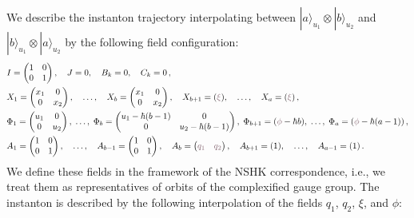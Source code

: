 \documentclass[10pt]{article}
\theoremstyle{definition}
\numberwithin{equation}{section}
\begin{document}
We describe the instanton trajectory interpolating between $|a\rangle_{u_1}\otimes |b\rangle_{u_2}$ and $|b\rangle_{u_1}\otimes |a\rangle_{u_2}$ by the following field configuration:
\begin{equation}
	\begin{aligned}
		& I=\begin{pmatrix}
			1 & 0\\
			0 & 1
		\end{pmatrix},\quad J=0,\quad B_k=0,\quad C_k=0\,,\\
		& X_1=\begin{pmatrix}
			x_1 & 0\\
			0 & x_2
		\end{pmatrix},\quad\ldots,\quad X_b=\begin{pmatrix}
		x_1 & 0\\
		0 & x_2
		\end{pmatrix}, \quad X_{b+1}=({\color{color2}\xi}),\quad\ldots,\quad X_{a}=({\color{color2}\xi})\,,\\
		& \Phi_1=\begin{pmatrix}
			u_1 & 0\\
			0 & u_2
		\end{pmatrix},\; \ldots,\; \Phi_b=\begin{pmatrix}
			u_1-\hbar(b-1) & 0\\
			0 & u_2-\hbar(b-1)
		\end{pmatrix}, \; \Phi_{b+1}=({\color{color2}\phi}-\hbar b),\; \ldots,\; \Phi_{a}=({\color{color2}\phi}-\hbar(a-1))\,,\\
		& A_1=\begin{pmatrix}
			1 & 0\\
			0 & 1\\
		\end{pmatrix},\quad\ldots,\quad A_{b-1}=\begin{pmatrix}
		1 & 0\\
		0 & 1\\
		\end{pmatrix},\quad A_b=\begin{pmatrix}
		{\color{color2}q_1} & {\color{color2}q_2}
		\end{pmatrix},\quad A_{b+1}=(1),\quad \ldots,\quad A_{a-1}=(1)\,.
	\end{aligned}
\end{equation}
We define these fields in the framework of the NSHK correspondence, i.e., we treat them as representatives of orbits of the complexified gauge group.
The instanton is described by the following interpolation of the fields $q_1$, $q_2$, $\xi$, and $\phi$:
\end{document}
